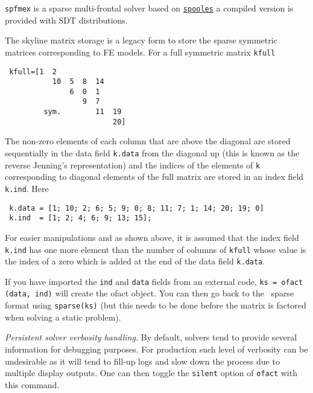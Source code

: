 \begin{SDT}

{\tt spfmex} is a sparse multi-frontal solver based on \href{http://www.netlib.org/linalg/spooles/spooles.2.2.html}{{\tt spooles}} a compiled version is provided with SDT distributions. 


 The skyline matrix storage is a legacy form to store the sparse symmetric matrices corresponding to FE models. For a full symmetric matrix {\tt kfull}

\begin{verbatim}
 kfull=[1  2
           10  5  8  14
               6  0  1
                  9  7
         sym.        11  19
                         20]
\end{verbatim}

The non-zero elements of each column that are above the diagonal are stored sequentially in the data field {\tt k.data} from the diagonal up (this is known as the reverse Jenning's representation) and the indices of the elements of {\tt k} corresponding to diagonal elements of the full matrix are stored in an index field {\tt k.ind}. Here

\begin{verbatim}
 k.data = [1; 10; 2; 6; 5; 9; 0; 8; 11; 7; 1; 14; 20; 19; 0]
 k.ind  = [1; 2; 4; 6; 9; 13; 15];
\end{verbatim}

For easier manipulations and as shown above, it is assumed that the index field {\tt k.ind} has one more element than the number of columns of {\tt kfull} whose value is the index of a zero which is added at the end of the data field {\tt k.data}.

If you have imported the {\tt ind} and {\tt data} fields from an external code, {\tt ks = ofact (data, ind)} will create the ofact object. You can then go back to the \matlab\ sparse format using {\tt sparse(ks)} (but this needs to be done before the matrix is factored when solving a static problem).



{\it Persistent solver verbosity handling.}
By default, solvers tend to provide several information for debugging purposes. For production such level of verbosity can be undesirable as it will tend to fill-up logs and slow down the process due to multiple display outputs. One can then toggle the {\tt silent} option of {\tt ofact} with this command.


\end{SDT}
